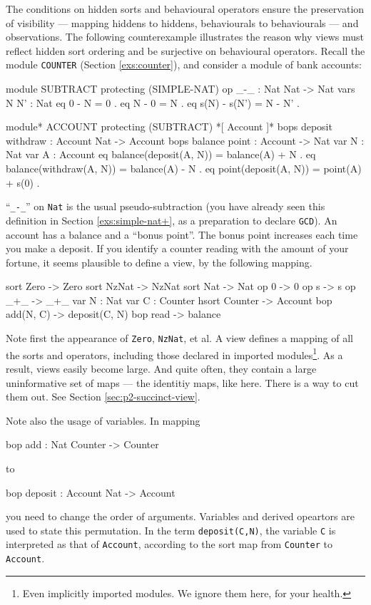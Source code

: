 \documentclass[a4paper]{memoir}
\begin{document}
The conditions on hidden sorts and behavioural operators ensure the
preservation of visibility --- mapping hiddens to hiddens, behaviourals
to behaviourals --- and observations. The following
counterexample illustrates the reason why views must reflect
hidden sort ordering and be surjective on behavioural operators.
Recall the module \verb|COUNTER| (Section \ref{exs:counter}), and
consider a module of bank accounts:\label{exs:account}
\begin{vvtm}
\begin{ccode}
  module SUBTRACT {
    protecting (SIMPLE-NAT)
    op _-_ : Nat Nat -> Nat
    vars N N' : Nat
    eq 0 - N = 0 .
    eq N - 0 = N .
    eq s(N) - s(N') = N - N' .
  }

  module* ACCOUNT {
    protecting (SUBTRACT)
    *[ Account ]*
    bops deposit withdraw : Account Nat -> Account
    bops balance point : Account -> Nat
    var N : Nat
    var A : Account
    eq balance(deposit(A, N)) = balance(A) + N .
    eq balance(withdraw(A, N)) = balance(A) - N .
    eq point(deposit(A, N)) = point(A) + s(0) .
  }
\end{ccode}
\end{vvtm}
``\verb|_-_|'' on \verb|Nat| is the usual pseudo-subtraction
(you have already seen this definition in Section \ref{exs:simple-nat+},
as a preparation to declare \verb|GCD|).
An account has a balance and a ``bonus point''. The bonus point
increases each time you make a deposit. If you identify a counter
reading with the amount of your fortune,
it seems plausible to define a view, by the following mapping.
\begin{vvtm}
\begin{ccode}
  sort Zero -> Zero
  sort NzNat -> NzNat
  sort Nat -> Nat
  op 0 -> 0
  op s -> s
  op _+_ -> _+_
  var N : Nat
  var C : Counter
  hsort Counter -> Account
  bop add(N, C) -> deposit(C, N)
  bop read -> balance
\end{ccode}
\end{vvtm}
Note first the appearance of \verb|Zero|, \verb|NzNat|, et al.
A view defines a mapping of all the sorts and operators, including those
declared in imported modules\footnote{
Even implicitly imported modules. We ignore them here, for your health.
}.
As a result, views easily become large.
And quite often, they contain a large uninformative set of maps --- the
identitiy maps, like here. There is a way to cut them out. See Section
\ref{sec:p2-succinct-view}.

Note also the usage of variables. In mapping
\begin{vvtm}
\begin{ccode}
  bop add : Nat Counter -> Counter
\end{ccode}
\end{vvtm}
to
\begin{vvtm}
\begin{ccode}
  bop deposit : Account Nat -> Account
\end{ccode}
\end{vvtm}
you need to change the order of arguments. Variables and derived opeartors
are used to state this permutation. In the term \verb|deposit(C,N)|, the
variable \verb|C| is interpreted as that of \verb|Account|, according to
the sort map from \verb|Counter| to \verb|Account|.
\end{document}
